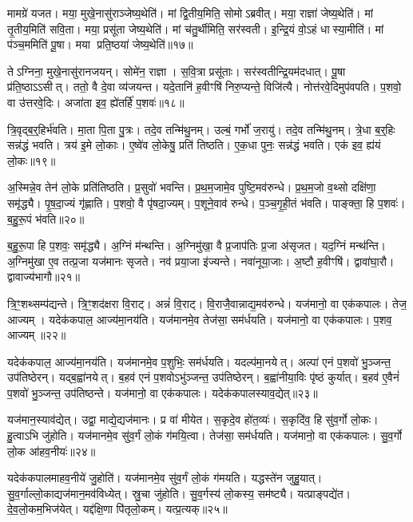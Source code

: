 मामग्रे॑ यजत।
मया॒ मुखे॒नासु॑राञ्जेष्य॒थेति॑।
मां द्वि॒तीय॒मिति॒ सोमो\-ऽब्रवीत्।
मया॒ राज्ञा॑ जेष्य॒थेति॑।
मां तृ॒तीय॒मिति॑ सवि॒ता।
मया॒ प्रसू॑ता जेष्य॒थेति॑।
मां च॑तु॒र्थीमिति॒ सर॑स्वती।
इ॒न्द्रि॒यं वो॒ऽहं धास्या॒मीति॑।
मां प॑ञ्च॒ममिति॑ पू॒षा।
मया प्रति॒ष्ठया॑ जेष्य॒थेति॑॥१७॥

तेऽग्निना॒ मुखे॒नासु॑रानजयन्।
सोमे॑न॒ राज्ञा।
स॒वि॒त्रा प्रसू॑ताः।
सर॑स्वतीन्द्रि॒यम॑दधात्।
पू॒षा प्र॑ति॒ष्ठा\-ऽऽसीत्।
ततो॒ वै दे॒वा व्य॑जयन्त।
यदे॒तानि॑ ह॒वीꣳषि॑ निरु॒प्यन्ते॒ विजि॑त्यै।
नोत्त॑रवे॒दिमुप॑वपति।
प॒शवो॒ वा उ॑त्तरवे॒दिः।
अजा॑ता इव॒ ह्ये॑तर्\mbox{}हि॑ प॒शवः॑॥१८॥\anuvakamend[ऐ॒दित्य॑शोचद्व्यु॒द्धर॑त्यब्रवीत्प्रति॒ष्ठया॑ जेष्य॒थेत्ये॒तर्\mbox{}हि॑ प॒शवः॑]

त्रि॒वृद्ब॒र्॒हिर्भ॑वति।
मा॒ता पि॒ता पु॒त्रः।
तदे॒व तन्मि॑थु॒नम्।
उल्बं॒ गर्भो॑ ज॒रायु॑।
तदे॒व तन्मि॑थु॒नम्।
त्रे॒धा ब॒र्॒हिः सन्न॑द्धं भवति।
त्रय॑ इ॒मे लो॒काः।
ए॒ष्वे॑व लो॒केषु॒ प्रति॑ तिष्ठति।
ए॒क॒धा पुनः॒ सन्न॑द्धं भवति।
एक॑ इव॒ ह्य॑यं लो॒कः॥१९॥

अ॒स्मिन्ने॒व तेन॑ लो॒के प्रति॑तिष्ठति।
प्र॒सुवो॑ भवन्ति।
प्र॒थ॒म॒जामे॒व पुष्टि॒मव॑रुन्धे।
प्र॒थ॒म॒जो व॒थ्सो दक्षि॑णा॒ समृ॑द्ध्यै।
पृ॒ष॒दा॒ज्यं गृ॑ह्णाति।
प॒शवो॒ वै पृ॑षदा॒ज्यम्।
प॒शूने॒वाव॑ रुन्धे।
प॒ञ्च॒गृ॒ही॒तं भ॑वति।
पाङ्क्ता॒ हि प॒शवः॑।
ब॒हु॒रू॒पं भ॑वति॥२०॥

ब॒हु॒रू॒पा हि प॒शवः॒ समृ॑द्ध्यै।
अ॒ग्निं म॑न्थन्ति।
अ॒ग्निमु॑खा॒ वै प्र॒जाप॑तिः प्र॒जा अ॑सृजत।
यद॒ग्निं मन्थ॑न्ति।
अ॒ग्निमु॑खा ए॒व तत्प्र॒जा यज॑मानः सृजते।
नव॑ प्रया॒जा इ॑ज्यन्ते।
नवा॑नूया॒जाः।
अ॒ष्टौ ह॒वीꣳषि॑।
द्वावा॑घा॒रौ।
द्वावाज्य॑भागौ॥२१॥

त्रि॒ꣳ॒शथ्सम्प॑द्यन्ते।
त्रि॒ꣳ॒शद॑क्षरा वि॒राट्।
अन्नं॑ वि॒राट्।
वि॒राजै॒वान्नाद्य॒मव॑रुन्धे।
यज॑मानो॒ वा एक॑कपालः।
तेज॒ आज्यम्।
यदेक॑कपाल॒ आज्य॑मा॒नय॑ति।
यज॑मानमे॒व तेज॑सा॒ सम॑र्धयति।
यज॑मानो॒ वा एक॑कपालः।
प॒शव॒ आज्यम्॥२२॥

यदेक॑कपाल॒ आज्य॑मा॒नय॑ति।
यज॑मानमे॒व प॒शुभिः॒ सम॑र्धयति।
यदल्प॑मा॒नयेत्।
अल्पा॑ एनं प॒शवो॑ भु॒ञ्जन्त॒ उप॑तिष्ठेरन्।
यद्ब॒ह्वा॑नयेत्।
ब॒हव॑ एनं प॒शवो\-ऽभु॑ञ्जन्त॒ उप॑तिष्ठेरन्।
ब॒ह्वा॑नीया॒विः पृ॑ष्ठं कुर्यात्।
ब॒हव॑ ए॒वैनं॑ प॒शवो॑ भु॒ञ्जन्त॒ उप॑तिष्ठन्ते।
यज॑मानो॒ वा एक॑कपालः।
यदेक॑कपालस्याव॒द्येत्॥२३॥

यज॑मान॒स्याव॑द्येत्।
उद्वा॒ माद्ये॒द्यज॑मानः।
प्र वा॑ मीयेत।
स॒कृदे॒व हो॑त॒व्यः॑।
स॒कृदि॑व॒ हि सु॑व॒र्गो लो॒कः।
हु॒त्वाऽभि जु॑होति।
यज॑मानमे॒व सु॑व॒र्गं लो॒कं ग॑मयि॒त्वा।
तेज॑सा॒ सम॑र्धयति।
यज॑मानो॒ वा एक॑कपालः।
सु॒व॒र्गो लो॒क आ॑हव॒नीयः॑॥२४॥

यदेक॑कपालमाहव॒नीये॑ जु॒होति॑।
यज॑मानमे॒व सु॑व॒र्गं लो॒कं ग॑मयति।
यद्धस्ते॑न जुहु॒यात्।
सु॒व॒र्गाल्लो॒काद्यज॑मान॒मव॑\-विध्येत्।
स्रु॒चा जु॑होति।
सु॒व॒र्गस्य॑ लो॒कस्य॒ सम॑ष्ट्यै।
यत्प्राङ्पद्ये॑त।
दे॒व॒लो॒कम॒भिज॑येत्।
यद्द॑क्षि॒णा पि॑तृलो॒कम्।
यत्प्र॒त्यक्॥२५॥

